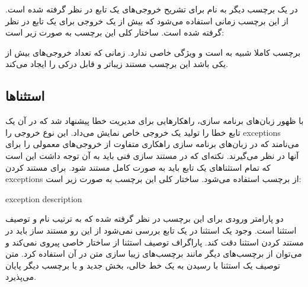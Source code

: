 در  یک برچسب دیگر به نام  برای تشریح خروجی‌های یک تابع در نظر گرفته شده است.
از این برچسب زمانی استفاده می‌شود که بیش از یک خروجی برای یک تابع در نظر گرفته شده است.
ساختار کلی این برچسب به صورت زیر است:
\begin{C++}
\end{C++}

\begin{note}
برچسب  کاملا شبیه به  است و ویژگی خاصی ندارد. 
زمانی که تعداد خروجی‌های بیش از یکی باشد این برچسب مستند زیباتر و قابل درکی را 
ایجاد می‌کند.
\end{note}

\subsection{استثناها}

با ظهور زبان‌های برنامه سازی، راهکارهایی برای مدیریت خطا پیشنهاد شد که در آن
یک تابع خطا را تولید یک خروجی خاص نمایش می‌داد.
این نوع خروجی را \glspl{exception} می‌نامند که در زبان‌های برنامه سازی راهکاری متفاوت
از خروجی‌های معمولی را برای آنها در نظر می‌گیرند.
نکته‌ای که در مستند سازی فنی باید به آن توجه داشت این است که تمام استثناهای یک
تابع باید به صورت کامل مستند شود.
برای مستند کردن \glspl{exception} از برچسب  استفاده می‌شود.
ساختار کلی این برچسب به صورت زیر است:
\begin{C++}
 { exception description }
\end{C++}

دو پارامتر ورودی برای این برچسب در نظر گرفته شده که به ترتیب نام و توصیف استثنا
است.
وجود یک استثنا در یک تابع بررسی نمی‌شود از این رو مستند ساز باید در
مستند کردن استثنا دقت کند.
پاراگراف توصیف استثنا از ساختار خاصی پیروی نمی‌کند و می‌توان از برچسب‌های دیگر مانند
برچسب‌های زیبا سازی متن در آن استفاده کرد.
متن توصیف یک استثنا با رسیدن به یک خط خالی، بخش جدید و یا برچسب دیگر پایان می‌پذیرد.

